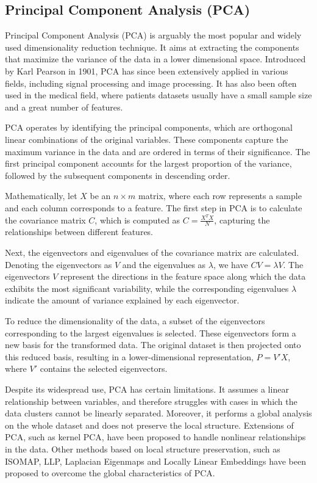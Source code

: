 \subsection{Principal Component Analysis (PCA)}

Principal Component Analysis (PCA) is arguably the most popular and widely used dimensionality reduction technique. It aims at extracting the components that maximize the variance of the data in a lower dimensional space. Introduced by Karl Pearson in 1901, PCA has since been extensively applied in various fields, including signal processing and image processing. It has also been often used in the medical field, where patients datasets usually have a small sample size and a great number of features.

PCA operates by identifying the principal components, which are orthogonal linear combinations of the original variables. These components capture the maximum variance in the data and are ordered in terms of their significance. The first principal component accounts for the largest proportion of the variance, followed by the subsequent components in descending order.

Mathematically, let $X$ be an $n \times m$ matrix, where each row represents a sample and each column corresponds to a feature. The first step in PCA is to calculate the covariance matrix $C$, which is computed as $C = \frac{X^T X}{N}$, capturing the relationships between different features.

Next, the eigenvectors and eigenvalues of the covariance matrix are calculated. Denoting the eigenvectors as $V$ and the eigenvalues as $\lambda$, we have $C V = \lambda V$. The eigenvectors $V$ represent the directions in the feature space along which the data exhibits the most significant variability, while the corresponding eigenvalues $\lambda$ indicate the amount of variance explained by each eigenvector.

To reduce the dimensionality of the data, a subset of the eigenvectors corresponding to the largest eigenvalues is selected. These eigenvectors form a new basis for the transformed data. The original dataset is then projected onto this reduced basis, resulting in a lower-dimensional representation, $P = V' X$, where $V'$ contains the selected eigenvectors.

Despite its widespread use, PCA has certain limitations. It assumes a linear relationship between variables, and therefore struggles with cases in which the data clusters cannot be linearly separated. Moreover, it performs a global analysis on the whole dataset and does not preserve the local structure.
Extensions of PCA, such as kernel PCA, have been proposed to handle nonlinear relationships in the data. Other methods based on local structure preservation, such as ISOMAP, LLP, Laplacian Eigenmaps and Locally Linear Embeddings have been proposed to overcome the global characteristics of PCA.



